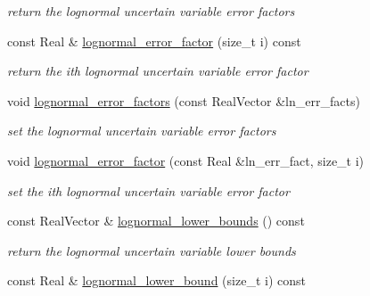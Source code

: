 \begin{DoxyCompactItemize}
\begin{DoxyCompactList}\small\item\em return the lognormal uncertain variable error factors \end{DoxyCompactList}\item 
const Real \& \hyperlink{classPecos_1_1AleatoryDistParams_a97b3b32a1babd2b7a7bf6ea22668723c}{lognormal\+\_\+error\+\_\+factor} (size\+\_\+t i) const \label{classPecos_1_1AleatoryDistParams_a97b3b32a1babd2b7a7bf6ea22668723c}

\begin{DoxyCompactList}\small\item\em return the ith lognormal uncertain variable error factor \end{DoxyCompactList}\item 
void \hyperlink{classPecos_1_1AleatoryDistParams_a8609c6cd9e7f079b5da2d3d45de2b9b8}{lognormal\+\_\+error\+\_\+factors} (const Real\+Vector \&ln\+\_\+err\+\_\+facts)\label{classPecos_1_1AleatoryDistParams_a8609c6cd9e7f079b5da2d3d45de2b9b8}

\begin{DoxyCompactList}\small\item\em set the lognormal uncertain variable error factors \end{DoxyCompactList}\item 
void \hyperlink{classPecos_1_1AleatoryDistParams_a00e3365550b1e8da3c0c87cbc18091b2}{lognormal\+\_\+error\+\_\+factor} (const Real \&ln\+\_\+err\+\_\+fact, size\+\_\+t i)\label{classPecos_1_1AleatoryDistParams_a00e3365550b1e8da3c0c87cbc18091b2}

\begin{DoxyCompactList}\small\item\em set the ith lognormal uncertain variable error factor \end{DoxyCompactList}\item 
const Real\+Vector \& \hyperlink{classPecos_1_1AleatoryDistParams_a8bb2d191e15f10608eb6edec1d370b45}{lognormal\+\_\+lower\+\_\+bounds} () const \label{classPecos_1_1AleatoryDistParams_a8bb2d191e15f10608eb6edec1d370b45}

\begin{DoxyCompactList}\small\item\em return the lognormal uncertain variable lower bounds \end{DoxyCompactList}\item 
const Real \& \hyperlink{classPecos_1_1AleatoryDistParams_ab848874cb39f5826c28d7f291b98305e}{lognormal\+\_\+lower\+\_\+bound} (size\+\_\+t i) const \label{classPecos_1_1AleatoryDistParams_ab848874cb39f5826c28d7f291b98305e}


\end{DoxyCompactItemize}
